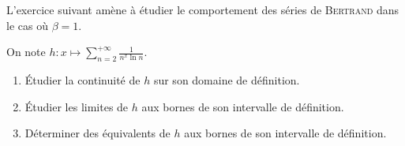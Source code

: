 L'exercice suivant amène à étudier le comportement des séries de \textsc{Bertrand} dans le cas où $\beta = 1$.

\begin{exercice}
    On note $h : x \mapsto \sum\limits_{n=2}^{+ \infty} \frac{1}{n^x \ln n}$.
    \begin{enumerate}
        \item Étudier la continuité de $h$ sur son domaine de définition.
        \item Étudier les limites de $h$ aux bornes de son intervalle de définition.
        \item Déterminer des équivalents de $h$ aux bornes de son intervalle de définition.
    \end{enumerate}
\end{exercice}

